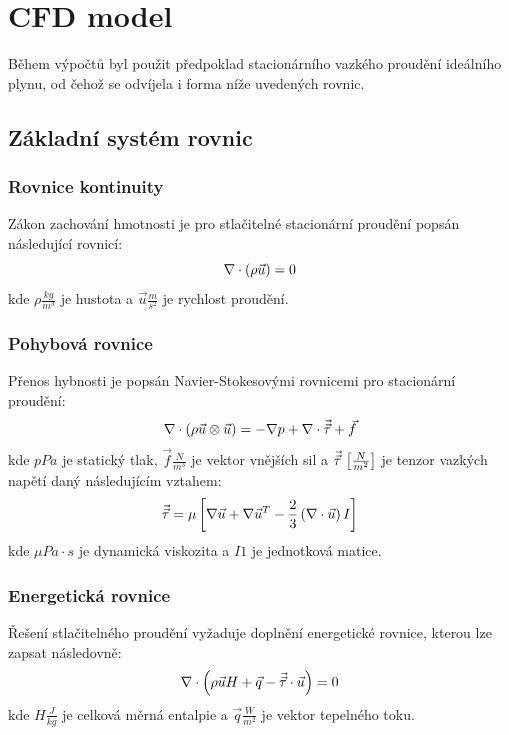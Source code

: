 \section{CFD model}
    Během výpočtů byl použit předpoklad stacionárního vazkého proudění ideálního plynu, od čehož se odvíjela i forma níže uvedených rovnic. 
    \subsection{Základní systém rovnic}
        
        \subsubsection{Rovnice kontinuity}
            Zákon zachování hmotnosti je pro stlačitelné stacionární proudění popsán následující rovnicí:
            \begin{equation} \label{eq:rovnice-kontinuity}
                \nabla \cdot  \left( \rho \Vec{u} \right) = 0  
            \end{equation}
            \noindent kde $\rho \unit{\frac{kg}{m^3}}$ je hustota a $\Vec{u} \unit{\frac{m}{s^2}}$  je rychlost proudění.
        
        \subsubsection{Pohybová rovnice}
            Přenos hybnosti je popsán Navier-Stokesovými rovnicemi pro stacionární proudění:
            \begin{equation} \label{eq:pohybova-rovnice}
                \nabla \cdot \left( \rho \Vec{u} \otimes \Vec{u} \right) = - \nabla p + \nabla \cdot \Vec{\Vec{\tau}} + \Vec{f}
            \end{equation}
            \noindent kde $p \unit{Pa}$ je statický tlak, $\Vec{f} \unit{\frac{N}{m^3}}$ je vektor vnějších sil a $\Vec{\Vec{\tau}} \, \left[ \frac{N}{m^2} \right]$ je tenzor vazkých napětí daný následujícím vztahem:
            \begin{equation} \label{eq:tenzor-vazkych-napeti}
                \Vec{\Vec{\tau}} = \mu \left[ \nabla \Vec{u} + \nabla \Vec{u}^T - \frac{2}{3} \left( \nabla \cdot \Vec{u} \right) I \right]
            \end{equation}
            \noindent kde $\mu \unit{Pa \cdot s}$ je dynamická viskozita a $I \unit{1}$ je jednotková matice.
            
        \subsubsection{Energetická rovnice}
            Řešení stlačitelného proudění vyžaduje doplnění energetické rovnice, kterou lze zapsat následovně:
            \begin{equation} \label{eq:energeticka-rovnice}
                \nabla \cdot \left( \rho \Vec{u} H + \Vec{q} - \Vec{\Vec{\tau}} \cdot \Vec{u} \right) = 0
            \end{equation}
            \noindent kde $H \unit{\frac{J}{kg}}$ je celková měrná entalpie a $\Vec{q} \unit{\frac{W}{m^2}}$ je vektor tepelného toku.
